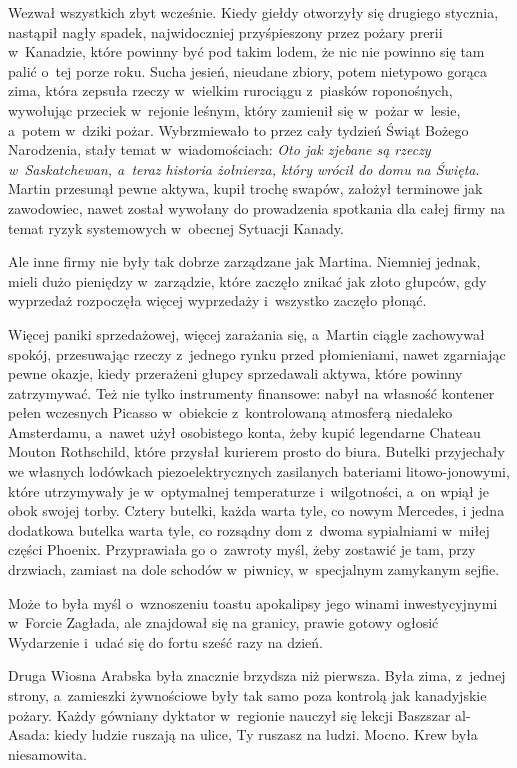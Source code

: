 \documentclass[oneside,polish,11pt,sfheadings]{mwbk}
\begin{document}
Wezwał wszystkich zbyt wcześnie. Kiedy giełdy otworzyły się drugiego
stycznia, nastąpił nagły spadek, najwidoczniej przyśpieszony przez
pożary prerii w~Kanadzie, które powinny być pod takim lodem, że nic nie
powinno się tam palić o~tej porze roku. Sucha jesień, nieudane zbiory,
potem nietypowo gorąca zima, która zepsuła rzeczy w~wielkim rurociągu z~piasków roponośnych, wywołując przeciek w~rejonie leśnym, który zamienił
się w~pożar w~lesie, a~potem w~dziki pożar. Wybrzmiewało to przez cały
tydzień Świąt Bożego Narodzenia, stały temat w~wiadomościach: \textit{Oto
jak zjebane są rzeczy w~Saskatchewan, a~teraz historia żołnierza, który
wrócił do domu na Święta}. Martin przesunął pewne aktywa, kupił trochę
swapów, założył terminowe jak zawodowiec, nawet został wywołany do
prowadzenia spotkania dla całej firmy na temat ryzyk systemowych w~obecnej Sytuacji Kanady.

Ale inne firmy nie były tak dobrze zarządzane jak Martina. Niemniej
jednak, mieli dużo pieniędzy w~zarządzie, które zaczęło znikać jak złoto
głupców, gdy wyprzedaż rozpoczęła więcej wyprzedaży i~wszystko zaczęło
płonąć.

Więcej paniki sprzedażowej, więcej zarażania się, a~Martin ciągle
zachowywał spokój, przesuwając rzeczy z~jednego rynku przed płomieniami,
nawet zgarniając pewne okazje, kiedy przerażeni głupcy sprzedawali
aktywa, które powinny zatrzymywać. Też nie tylko instrumenty finansowe:
nabył na własność kontener pełen wczesnych Picasso w~obiekcie z~kontrolowaną atmosferą niedaleko Amsterdamu, a~nawet użył osobistego
konta, żeby kupić legendarne Chateau Mouton Rothschild, które przysłał
kurierem prosto do biura. Butelki przyjechały we własnych lodówkach
piezoelektrycznych zasilanych bateriami litowo-jonowymi, które
utrzymywały je w~optymalnej temperaturze i~wilgotności, a~on wpiął je
obok swojej torby. Cztery butelki, każda warta tyle, co nowym Mercedes,
i jedna dodatkowa butelka warta tyle, co rozsądny dom z~dwoma
sypialniami w~miłej części Phoenix. Przyprawiała go o~zawroty myśl, żeby
zostawić je tam, przy drzwiach, zamiast na dole schodów w~piwnicy, w~specjalnym zamykanym sejfie.

Może to była myśl o~wznoszeniu toastu apokalipsy jego winami
inwestycyjnymi w~Forcie Zagłada, ale znajdował się na granicy, prawie
gotowy ogłosić Wydarzenie i~udać się do fortu sześć razy na dzień.

Druga Wiosna Arabska była znacznie brzydsza niż pierwsza. Była zima, z~jednej strony, a~zamieszki żywnościowe były tak samo poza kontrolą jak
kanadyjskie pożary. Każdy gówniany dyktator w~regionie nauczył się
lekcji Baszszar al-Asada: kiedy ludzie ruszają na ulice, Ty ruszasz na
ludzi. Mocno. Krew była niesamowita.
\end{document}
